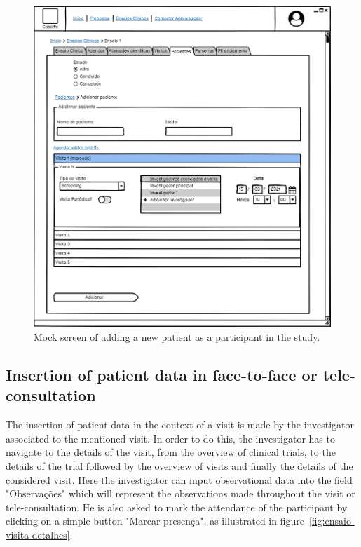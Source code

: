 \begin{figure}[H]
    \centering
    \includegraphics[scale=0.35]{images/ensaio-adicionar-paciente.png}
    \caption{Mock screen of adding a new patient as a participant in the study.}
    \label{fig:ensaio-adicionar-paciente}
\end{figure}

\subsection{Insertion of patient data in face-to-face or tele-consultation}

The insertion of patient data in the context of a visit is made by the investigator associated to the mentioned visit. In order to do this, the investigator has to navigate to the details of the visit, from the overview of clinical trials, to the details of the trial followed by the overview of visits and finally the details of the considered visit. Here the investigator can input observational data into the field "Observações" which will represent the observations made throughout the visit or tele-consultation. He is also asked to mark the attendance of the participant by clicking on a simple button "Marcar presença", as illustrated in figure~\ref{fig:ensaio-visita-detalhes}.

